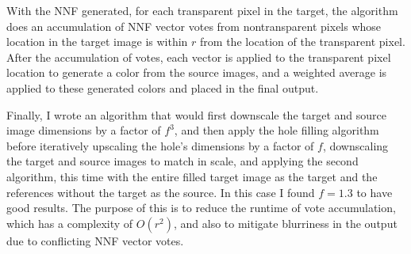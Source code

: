 With the NNF generated, for each transparent pixel in the target, the algorithm does an accumulation of NNF vector votes from nontransparent pixels whose location in the target image is within $r$ from the location of the transparent pixel. After the accumulation of votes, each vector is applied to the transparent pixel location to generate a color from the source images, and a weighted average is applied to these generated colors and placed in the final output.

Finally, I wrote an algorithm that would first downscale the target and source image dimensions by a factor of $f^3$, and then apply the hole filling algorithm before iteratively upscaling the hole's dimensions by a factor of $f$, downscaling the target and source images to match in scale, and applying the second algorithm, this time with the entire filled target image as the target and the references without the target as the source. In this case I found $f = 1.3$ to have good results. The purpose of this is to reduce the runtime of vote accumulation, which has a complexity of $O(r^2)$, and also to mitigate blurriness in the output due to conflicting NNF vector votes.